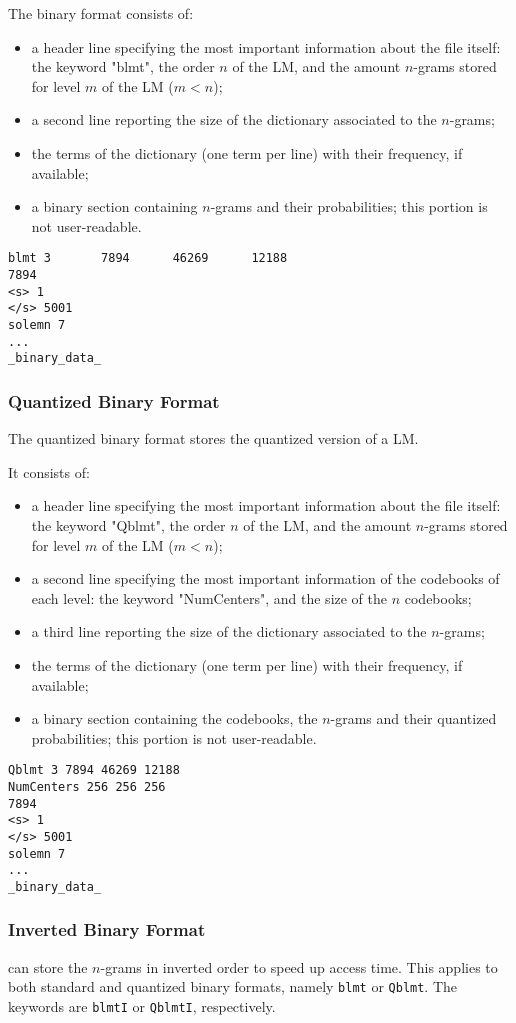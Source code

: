 \noindent 
The binary format consists of:
\begin{itemize}
\item a header line specifying the most important information about the file itself: the keyword "blmt", the order $n$ of the LM, and the amount $n$-grams stored for level $m$ of the LM ($m<n$);
\item a second line reporting the size of the dictionary associated to the $n$-grams;
\item the terms of the dictionary (one term per line) with their frequency, if available;
\item a binary section containing $n$-grams and their probabilities; this portion is not user-readable.
\end{itemize}

\begin{verbatim}
blmt 3       7894      46269      12188
7894
<s> 1
</s> 5001
solemn 7
...
_binary_data_
\end{verbatim}

\subsubsection{Quantized Binary Format}
The quantized binary format stores the quantized version of a LM.

\noindent 
It consists of:
\begin{itemize}
\item a header line specifying the most important information about the file itself: the keyword "Qblmt", the order $n$ of the LM, and the amount $n$-grams stored for level $m$ of the LM ($m<n$);
\item a second line specifying the most important information of the codebooks of each level: the keyword "NumCenters", and  the size of the $n$ codebooks;
\item a third line reporting the size of the dictionary associated to the $n$-grams;
\item the terms of the dictionary (one term per line) with their frequency, if available;
\item a binary section containing the codebooks, the $n$-grams and their quantized probabilities; this portion is not user-readable.
\end{itemize}

\begin{verbatim}
Qblmt 3 7894 46269 12188
NumCenters 256 256 256
7894
<s> 1
</s> 5001
solemn 7
...
_binary_data_
\end{verbatim}



\subsubsection{Inverted Binary Format}
{\IRSTLM} can store the $n$-grams in inverted order to speed up access time. This applies to both standard and quantized binary formats, namely {\tt blmt} or {\tt Qblmt}. The keywords are {\tt blmtI} or {\tt QblmtI}, respectively.
